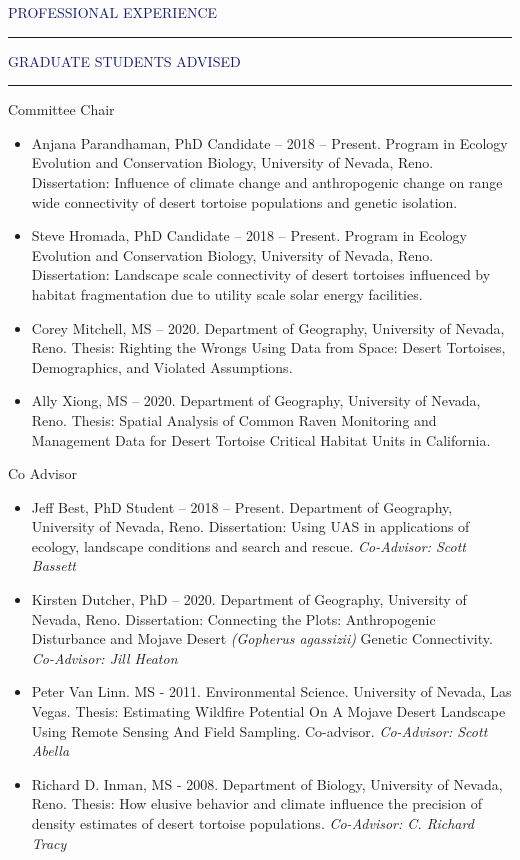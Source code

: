 \documentclass{resume} %
\renewenvironment{rSection}[1]{
\sectionskip
\textcolor{MidnightBlue}{\MakeUppercase{#1}}
\sectionlineskip
\hrule
\begin{list}{}{
\setlength{\leftmargin}{1.5em}
}
\item[]
}{
\end{list}
}
\begin{document}
\begin{rSection}{Professional Experience}
\begin{rSection}{Graduate Students Advised}

\begin{rSubsection}{Committee Chair}{}{}{}
\begin{itemize}

\item Anjana Parandhaman, PhD Candidate – 2018 – Present. Program in Ecology Evolution and Conservation Biology, University of Nevada, Reno. Dissertation: Influence of climate change and anthropogenic change on range wide connectivity of desert tortoise populations and genetic isolation. 
\item Steve Hromada, PhD Candidate – 2018 – Present. Program in Ecology Evolution and Conservation Biology, University of Nevada, Reno. Dissertation: Landscape scale connectivity of desert tortoises influenced by habitat fragmentation due to utility scale solar energy facilities. 
\item Corey Mitchell, MS  – 2020. Department of Geography, University of Nevada, Reno. Thesis: Righting the Wrongs Using Data from Space: Desert Tortoises, Demographics, and Violated Assumptions.
\item Ally Xiong, MS – 2020. Department of Geography, University of Nevada, Reno. Thesis: Spatial Analysis of Common Raven Monitoring and Management Data for Desert Tortoise Critical Habitat Units in California. 
\end{itemize}

\end{rSubsection}
\begin{rSubsection}{Co Advisor}{}{}{}
\begin{itemize}

\item Jeff Best, PhD Student – 2018 – Present. Department of Geography, University of Nevada, Reno.  Dissertation: Using UAS in applications of ecology, landscape conditions and search and rescue. \textit{Co-Advisor: Scott Bassett}
\item Kirsten Dutcher, PhD – 2020. Department of Geography, University of Nevada, Reno. Dissertation: Connecting the Plots: Anthropogenic Disturbance and 
Mojave Desert \textit{(Gopherus agassizii)} Genetic Connectivity. \textit{Co-Advisor: Jill Heaton}
\item Peter Van Linn. MS - 2011. Environmental Science. University of Nevada, Las Vegas. Thesis: Estimating Wildfire Potential On A Mojave Desert Landscape Using Remote Sensing And Field Sampling. Co-advisor. \textit{Co-Advisor: Scott Abella}
\item Richard D. Inman, MS - 2008. Department of Biology, University of Nevada, Reno. Thesis: How elusive behavior and climate influence the precision of density estimates of desert tortoise populations. \textit{Co-Advisor: C. Richard Tracy}
\end{itemize}


\end{rSubsection}
\end{rSection}
\end{rSection}
\end{document}
